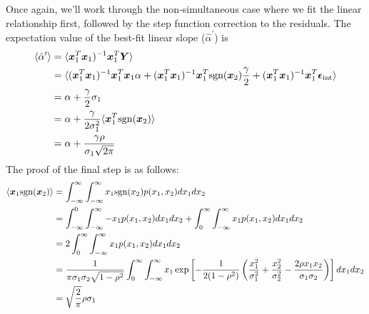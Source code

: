 Once again, we'll work through the non-simultaneous case where we fit the linear relationship first, followed by the step function correction to the residuals. The expectation value of the best-fit linear slope ($\hat{\alpha}^\prime$) is
\begin{align}
    \langle\hat{\alpha}^\prime\rangle &= \langle \bm{x}_1^T\bm{x}_1)^{-1}\bm{x}_1^T\bm{Y}\rangle \nonumber\\
    &= \langle(\bm{x}_1^T\bm{x}_1)^{-1}\bm{x}_1^T\bm{x}_1\alpha + (\bm{x}_1^T\bm{x}_1)^{-1}\bm{x}_1^T\text{sgn}(\bm{x}_2)\frac{\gamma}{2}+(\bm{x}_1^T\bm{x}_1)^{-1}\bm{x}_1^T\bm{\epsilon}_\text{int}\rangle\nonumber\\
    &= \alpha + \frac{\gamma}{2}\sigma_1\nonumber \\
    &= \alpha + \frac{\gamma}{2\sigma_1^2}\langle\bm{x}_1^T\text{sgn}(\bm{x}_2)\rangle \nonumber\\
    &= \alpha + \frac{\gamma\rho}{\sigma_1\sqrt{2\pi}}
\label{eqn:slope_inflation}
\end{align}
The proof of the final step is as follows:
\begin{align}
\label{eqn:exp_val_abs_val}
    \langle \bm{x}_1\text{sgn}(\bm{x}_2)\rangle &= \displaystyle\int_{-\infty}^\infty \displaystyle\int_{-\infty}^\infty x_1\text{sgn}(x_2)p(x_1, x_2)dx_1dx_2\nonumber\\
    &= \displaystyle\int_{-\infty}^0 \displaystyle\int_{-\infty}^\infty -x_1 p(x_1, x_2)dx_1dx_2+
    \displaystyle\int_{0}^\infty \displaystyle\int_{-\infty}^\infty x_1 p(x_1, x_2)dx_1dx_2\nonumber\\
    &= 2 \displaystyle\int_{0}^\infty \displaystyle\int_{-\infty}^\infty x_1 p(x_1, x_2)dx_1dx_2\nonumber\\
    &= \frac{1}{\pi\sigma_1\sigma_2\sqrt{1-\rho^2}}\displaystyle\int_{0}^\infty \displaystyle\int_{-\infty}^\infty x_1 \exp\left[-\frac{1}{2(1-\rho^2)}\left(\frac{x_1^2}{\sigma_1^2}+\frac{x_2^2}{\sigma_2^2}-\frac{2\rho x_1 x_2}{\sigma_1\sigma_2}\right)\right]dx_1dx_2\nonumber\\
    &= \sqrt\frac{2}{\pi}\rho\sigma_1
\end{align}

